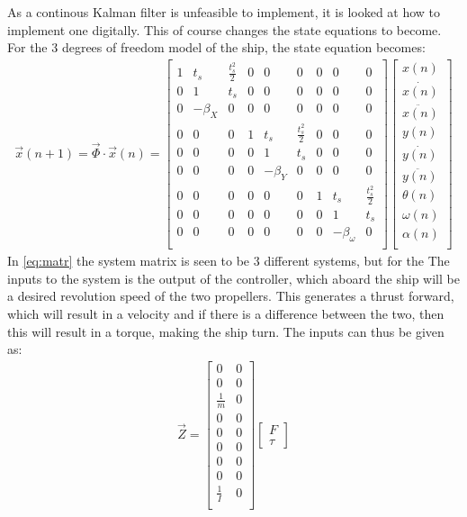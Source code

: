 As a continous Kalman filter is unfeasible to implement, it is looked at how to implement one digitally. This of course changes the state equations to become. For the 3 degrees of freedom model of the ship, the state equation becomes: 
\begin{align}
\vec{x}(n+1) = \vec{\Phi}\cdot\vec{x}(n) = \begin{bmatrix}
1 & t_s & \frac{t_s^2}{2} & 0 & 0 & 0 & 0 & 0 & 0\\
0 & 1 & t_s & 0 & 0 & 0 & 0 & 0 & 0\\
0 & -\beta_X & 0 & 0 & 0 & 0 & 0 & 0 & 0\\
0 & 0 & 0 & 1 & t_s & \frac{t_s^2}{2} & 0 & 0 & 0\\
0 & 0 & 0 & 0 & 1 & t_s & 0 & 0 & 0\\
0 & 0 & 0 & 0 & -\beta_Y & 0 & 0 & 0 & 0\\
0 & 0 & 0 & 0 & 0 & 0 & 1 & t_s & \frac{t_s^2}{2}\\
0 & 0 & 0 & 0 & 0 & 0 & 0 & 1 & t_s\\
0 & 0 & 0 & 0 & 0 & 0 & 0 & -\beta_\omega & 0\\
\end{bmatrix}\begin{bmatrix}
x(n)\\
\dot{x(n)}\\
\ddot{x(n)}\\
y(n)\\
\dot{y(n)}\\
\ddot{y(n)}\\
\theta(n)\\
\omega(n)\\
\alpha(n)\\
\end{bmatrix}
\label{eq:matr}
\end{align}
In \vref{eq:matr} the system matrix is seen to be 3 different systems, but for the 
The inputs to the system is the output of the controller, which aboard the ship will be a desired revolution speed of the two propellers. This generates a thrust forward, which will result in a velocity and if there is a difference between the two, then this will result in a torque, making the ship turn. The inputs can thus be given as:
\begin{align}
\vec{Z} = \begin{bmatrix}
0 & 0\\
0 & 0\\
\frac{1}{m} & 0\\
0 & 0\\
0 & 0\\
0 & 0\\
0 & 0\\
0 & 0\\
\frac{1}{I} & 0\\
\end{bmatrix}\begin{bmatrix}
F\\
\tau
\end{bmatrix}
\end{align}

